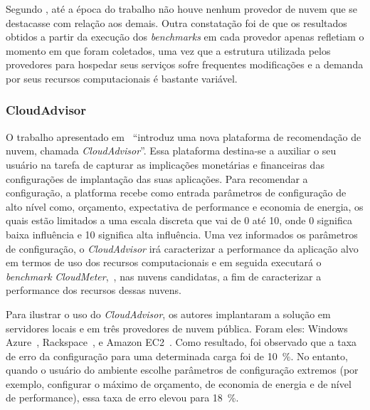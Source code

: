 Segundo , até a época do trabalho não houve
nenhum provedor de nuvem que se destacasse com relação aos demais. Outra constatação foi de que os resultados
obtidos a partir da execução dos {\em benchmarks} em cada provedor apenas refletiam o momento em que foram coletados, uma vez que a estrutura utilizada pelos provedores para hospedar seus serviços sofre frequentes modificações e a demanda por seus recursos computacionais é bastante variável.


\subsubsection{CloudAdvisor}
O trabalho apresentado em~\cite{jung2013cloudadvisor} ``introduz uma nova plataforma de recomendação de nuvem, chamada {\em CloudAdvisor}''. Essa plataforma destina-se a auxiliar o seu usuário na tarefa de capturar as implicações monetárias e financeiras das configurações de implantação das suas aplicações. Para recomendar a configuração, a platforma recebe como entrada parâmetros de configuração de alto nível como, orçamento, expectativa de performance e economia de energia, os quais estão limitados a uma escala discreta que vai de 0 até 10, onde 0 significa baixa influência e 10 significa alta influência. Uma vez informados os parâmetros de configuração, o {\em CloudAdvisor} irá caracterizar a performance da aplicação alvo em termos de uso dos recursos computacionais e em seguida executará o {\em benchmark} {\em CloudMeter},~\cite{jung2013cloudadvisor}, nas nuvens candidatas, a fim de caracterizar a performance dos recursos dessas nuvens.

Para ilustrar o uso do {\em CloudAdvisor}, os autores implantaram a solução em servidores locais e em três provedores de nuvem pública. Foram eles: Windows Azure~\cite{azure}, Rackspace~\cite{rackspace}, e Amazon EC2~\cite{ec2}. Como resultado, foi observado que a taxa de erro da configuração para uma determinada carga foi de 10~\%. No entanto, quando o usuário do ambiente escolhe parâmetros de configuração extremos (por exemplo, configurar o máximo de orçamento, de economia de energia e de nível de performance), essa taxa de erro elevou para 18~\%.

